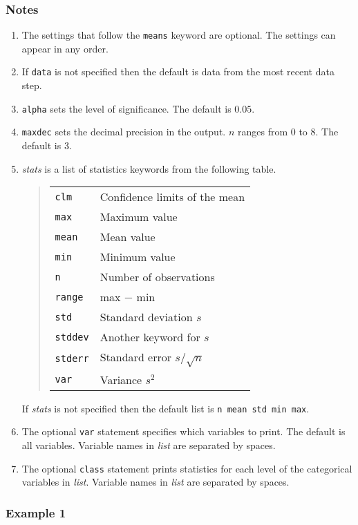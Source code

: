 \documentclass[12pt]{article}
\begin{document}
\subsubsection*{Notes}

\begin{enumerate}
\item
The settings that follow the {\tt means} keyword are optional.
The settings can appear in any order.
\item
If {\tt data} is not specified then the default is data from
the most recent data step.
\item
{\tt alpha} sets the level of significance.
The default is $0.05$.
\item
{\tt maxdec} sets the decimal precision in the output.
$n$ ranges from 0 to 8.
The default is 3.
\item
{\it stats} is a list of statistics keywords
from the following table.
\begin{quote}
\begin{tabular}{ll}
{\tt clm} & Confidence limits of the mean\\
{\tt max} & Maximum value\\
{\tt mean} & Mean value\\
{\tt min} & Minimum value\\
{\tt n} & Number of observations\\
{\tt range} & max $-$ min\\
{\tt std} & Standard deviation $s$\\
{\tt stddev} & Another keyword for $s$\\
{\tt stderr} & Standard error $s/\sqrt n$\\
{\tt var} & Variance $s^2$
\end{tabular}
\end{quote}
If {\it stats} is not specified then the default list is
{\tt n mean std min max}.
\item
The optional {\tt var} statement specifies which variables to print.
The default is all variables.
Variable names in {\it list} are separated by spaces.
\item
The optional {\tt class} statement prints statistics for each level
of the categorical variables in {\it list}.
Variable names in {\it list} are separated by spaces.
\end{enumerate}

\subsubsection*{Example 1}
\end{document}
